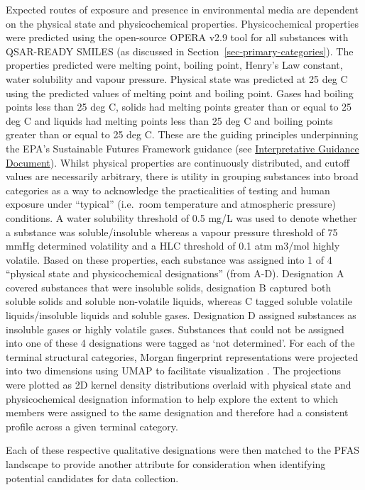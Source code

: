 \documentclass[
  super,
  preprint,
  3p]{elsarticle}
\begin{document}
Expected routes of exposure and presence in environmental media are
dependent on the physical state and physicochemical properties.
Physicochemical properties were predicted using the open-source OPERA
v2.9 tool \citep{mansouri_opera_2018} for all substances with QSAR-READY
SMILES (as discussed in Section~\ref{sec-primary-categories}). The
properties predicted were melting point, boiling point, Henry's Law
constant, water solubility and vapour pressure. Physical state was
predicted at 25 deg C using the predicted values of melting point and
boiling point. Gases had boiling points less than 25 deg C, solids had
melting points greater than or equal to 25 deg C and liquids had melting
points less than 25 deg C and boiling points greater than or equal to 25
deg C. These are the guiding principles underpinning the EPA's
Sustainable Futures Framework guidance (see
\href{https://www.epa.gov/sites/default/files/2015-05/documents/05-iad_discretes_june2013.pdf}{Interpretative
Guidance Document}). Whilst physical properties are continuously
distributed, and cutoff values are necessarily arbitrary, there is
utility in grouping substances into broad categories as a way to
acknowledge the practicalities of testing and human exposure under
``typical'' (i.e.~room temperature and atmospheric pressure) conditions.
A water solubility threshold of 0.5 mg/L was used to denote whether a
substance was soluble/insoluble whereas a vapour pressure threshold of
75 mmHg determined volatility and a HLC threshold of 0.1 atm m3/mol
highly volatile. Based on these properties, each substance was assigned
into 1 of 4 ``physical state and physicochemical designations'' (from
A-D). Designation A covered substances that were insoluble solids,
designation B captured both soluble solids and soluble non-volatile
liquids, whereas C tagged soluble volatile liquids/insoluble liquids and
soluble gases. Designation D assigned substances as insoluble gases or
highly volatile gases. Substances that could not be assigned into one of
these 4 designations were tagged as `not determined'. For each of the
terminal structural categories, Morgan fingerprint representations were
projected into two dimensions using UMAP to facilitate visualization
\citep{mcinnes2020umap}. The projections were plotted as 2D kernel
density distributions overlaid with physical state and physicochemical
designation information to help explore the extent to which members were
assigned to the same designation and therefore had a consistent profile
across a given terminal category.

Each of these respective qualitative designations were then matched to
the PFAS landscape to provide another attribute for consideration when
identifying potential candidates for data collection.
\end{document}
